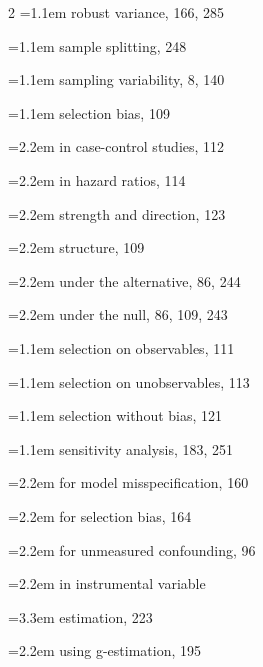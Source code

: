 \begin{multicols}{2}
\hangindent=1.1em robust variance, 166, 285\par
\hangindent=1.1em sample splitting, 248\par
\hangindent=1.1em sampling variability, 8, 140\par
\hangindent=1.1em selection bias, 109\par
\hspace*{1.1em}\hangindent=2.2em in case-control studies, 112\par
\hspace*{1.1em}\hangindent=2.2em in hazard ratios, 114\par
\hspace*{1.1em}\hangindent=2.2em strength and direction, 123\par
\hspace*{1.1em}\hangindent=2.2em structure, 109\par
\hspace*{1.1em}\hangindent=2.2em under the alternative, 86, 244\par
\hspace*{1.1em}\hangindent=2.2em under the null, 86, 109, 243\par
\hangindent=1.1em selection on observables, 111\par
\hangindent=1.1em selection on unobservables, 113\par
\hangindent=1.1em selection without bias, 121\par
\hangindent=1.1em sensitivity analysis, 183, 251\par
\hspace*{1.1em}\hangindent=2.2em for model misspecification, 160\par
\hspace*{1.1em}\hangindent=2.2em for selection bias, 164\par
\hspace*{1.1em}\hangindent=2.2em for unmeasured confounding, 96\par
\hspace*{1.1em}\hangindent=2.2em in instrumental variable\par
\hspace*{2.2em}\hangindent=3.3em estimation, 223\par
\hspace*{1.1em}\hangindent=2.2em using g-estimation, 195\par

\end{multicols}
